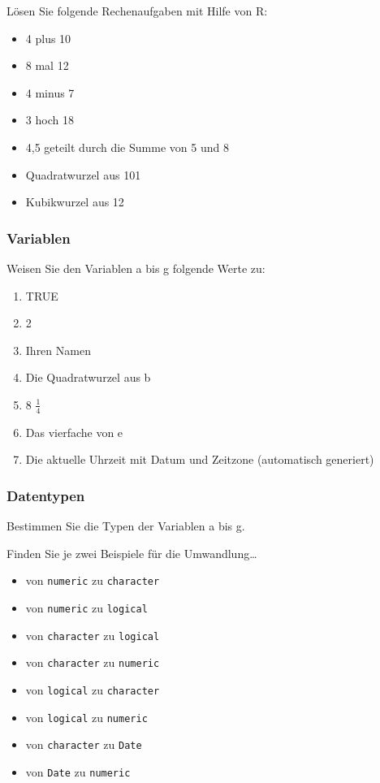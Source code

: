 \documentclass[11pt,german,a4paper]{article}
\providecommand{\tightlist}{%
  \setlength{\itemsep}{0pt}\setlength{\parskip}{0pt}}
\begin{document}
Lösen Sie folgende Rechenaufgaben mit Hilfe von R:

\begin{itemize}
\tightlist
\item
  4 plus 10
\item
  8 mal 12
\item
  4 minus 7
\item
  3 hoch 18
\item
  4,5 geteilt durch die Summe von 5 und 8
\item
  Quadratwurzel aus 101
\item
  Kubikwurzel aus 12
\end{itemize}

\hypertarget{variablen-1}{%
\subsubsection{Variablen}\label{variablen-1}}

Weisen Sie den Variablen a bis g folgende Werte zu:

\begin{enumerate}
\def\labelenumi{\alph{enumi})}
\tightlist
\item
  TRUE
\item
  2
\item
  Ihren Namen
\item
  Die Quadratwurzel aus b
\item
  8 \(\textstyle\frac{1}{4}\)
\item
  Das vierfache von e
\item
  Die aktuelle Uhrzeit mit Datum und Zeitzone (automatisch generiert)
\end{enumerate}

\hypertarget{datentypen-1}{%
\subsubsection{Datentypen}\label{datentypen-1}}

Bestimmen Sie die Typen der Variablen a bis g.

Finden Sie je zwei Beispiele für die Umwandlung\ldots{}

\begin{itemize}
\tightlist
\item
  von \texttt{numeric} zu \texttt{character}
\item
  von \texttt{numeric} zu \texttt{logical}
\item
  von \texttt{character} zu \texttt{logical}
\item
  von \texttt{character} zu \texttt{numeric}
\item
  von \texttt{logical} zu \texttt{character}
\item
  von \texttt{logical} zu \texttt{numeric}
\item
  von \texttt{character} zu \texttt{Date}
\item
  von \texttt{Date} zu \texttt{numeric}
\end{itemize}
\end{document}
